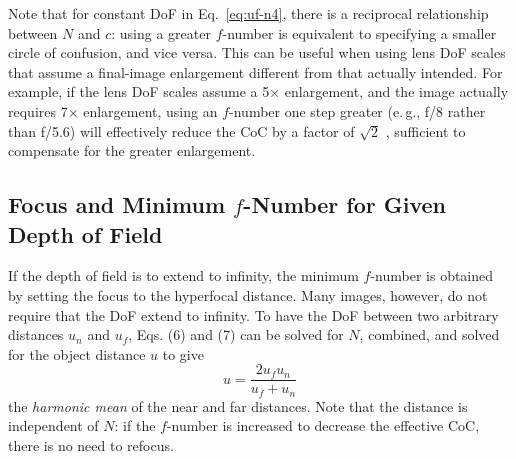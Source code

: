 \documentclass[11pt, oneside]{scrartcl}   	%
\begin{document}
Note that for constant DoF in Eq.~\ref{eq:uf-n4}, there is a reciprocal relationship between $N$ and
$c$: using a greater $f$-number is equivalent to specifying a smaller circle of confusion, and vice versa. This can be useful when using lens DoF scales that assume a final-image enlargement different from that actually intended. For example, if the lens DoF scales assume a 5× enlargement, and the image actually requires 7× enlargement, using an $f$-number one step greater (e.\,g., f/8 rather than f/5.6) will effectively reduce the CoC by a factor of $\sqrt 2$ , sufficient to compensate for the greater enlargement.
\subsection{Focus and Minimum $f$-Number for Given Depth of Field}

If the depth of field is to extend to infinity, the minimum $f$-number
is obtained by setting the focus to the hyperfocal distance. Many
images, however, do not require that the DoF extend to infinity. To
have the DoF between two arbitrary distances $u_n$ and $u_f$, Eqs. (6)
and (7) can be solved for $N$, combined, and solved for the object
distance $u$ to give
\begin{equation}
  \label{eq:u}
  u = \frac{2u_fu_n}{u_f+u_n}
\end{equation}
the \emph{harmonic mean} of the near and far distances. Note that the distance is independent of $N$: if the $f$-number is increased to decrease the effective CoC, there is no need to refocus.
\end{document}
